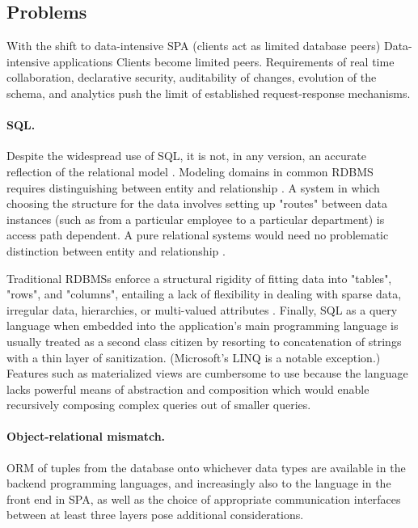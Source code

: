 \subsection{Problems}
With the shift to data-intensive \gls{SPA} (clients act as limited database peers)
Data-intensive applications
Clients become limited peers.
Requirements of real time collaboration, declarative security, auditability of changes, evolution of the schema, and analytics push the limit of established request-response mechanisms.


\paragraph{\gls{SQL}.}
Despite the widespread use of SQL, it is not, in any version, an accurate reflection of the relational model \cite{codd1990relational} \cite{tarpit}.
Modeling domains in common \gls{RDBMS} requires distinguishing between entity and relationship \cite{chen1976entity}. A system in which choosing the structure for the data involves setting up "routes" between data instances (such as from a particular employee to a particular department) is access path dependent. A pure relational systems would need no problematic distinction between entity and relationship \cite{tarpit}.

Traditional RDBMSs enforce a structural rigidity of fitting data into "tables", "rows", and "columns", entailing a lack of flexibility in dealing with sparse data, irregular data, hierarchies, or multi-valued attributes \cite{hickey2012dbvalue}. Finally, SQL as a query language when embedded into the application's main programming language is usually treated as a second class citizen by resorting to concatenation of strings with a thin layer of sanitization. (Microsoft's LINQ \cite{meijer2006linq} is a notable exception.) Features such as materialized views are cumbersome to use because the language lacks powerful means of abstraction and composition \cite{sicp} which would enable recursively composing complex queries out of smaller queries.

\paragraph{Object-relational mismatch.}
\gls{ORM} of tuples from the database onto whichever data types are available in the backend programming languages, and increasingly also to the language in the front end in \gls{SPA}, as well as the choice of appropriate communication interfaces between at least three layers pose additional considerations.

